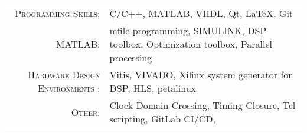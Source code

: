 
\renewcommand{\arraystretch}{1.1}

\begin{tabular}{>{}r>{}p{13cm}}
	\textsc{Programming Skills:}            & C/C++, MATLAB, VHDL, Qt, \LaTeX,   Git                                              \\
	\textsc{MATLAB:}                        & mfile programming, SIMULINK, DSP toolbox, Optimization toolbox, Parallel processing \\
	\textsc{Hardware Design Environments :} & Vitis, VIVADO, Xilinx system generator for DSP, HLS, petalinux                      \\
	\textsc{Other:}                         & Clock Domain Crossing, Timing Closure, Tcl scripting, GitLab CI/CD,
\end{tabular}
